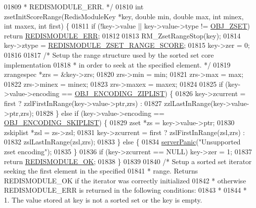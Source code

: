 \begin{DoxyCode}
{{{01809 \textcolor{comment}{ * REDISMODULE\_ERR. */}
01810 \textcolor{keywordtype}{int} zsetInitScoreRange(RedisModuleKey *key, \textcolor{keywordtype}{double} min, \textcolor{keywordtype}{double} max, \textcolor{keywordtype}{int} minex, \textcolor{keywordtype}{int} maxex, \textcolor{keywordtype}{int} first) \{
01811     \textcolor{keywordflow}{if} (!key->value || key->value->type != \hyperlink{server_8h_a8c356422ddbc03bd77694880a30a1953}{OBJ\_ZSET}) \textcolor{keywordflow}{return} 
      \hyperlink{redismodule_8h_a3df6f5bd5247289e66f44437a7cddd49}{REDISMODULE\_ERR};
01812 
01813     RM\_ZsetRangeStop(key);
01814     key->ztype = \hyperlink{module_8c_a103d0f18dc1536298a03324d5ba545be}{REDISMODULE\_ZSET\_RANGE\_SCORE};
01815     key->zer = 0;
01816 
01817     \textcolor{comment}{/* Setup the range structure used by the sorted set core implementation}
01818 \textcolor{comment}{     * in order to seek at the specified element. */}
01819     zrangespec *zrs = &key->zrs;
01820     zrs->min = min;
01821     zrs->max = max;
01822     zrs->minex = minex;
01823     zrs->maxex = maxex;
01824 
01825     \textcolor{keywordflow}{if} (key->value->encoding == \hyperlink{server_8h_aabf064ede983103f1fd0df2086e84eee}{OBJ\_ENCODING\_ZIPLIST}) \{
01826         key->zcurrent = first ? zzlFirstInRange(key->value->ptr,zrs) :
01827                                 zzlLastInRange(key->value->ptr,zrs);
01828     \} \textcolor{keywordflow}{else} \textcolor{keywordflow}{if} (key->value->encoding == \hyperlink{server_8h_acfb35db5cb30ed113ed23aeb1a224c4c}{OBJ\_ENCODING\_SKIPLIST}) \{
01829         zset *zs = key->value->ptr;
01830         zskiplist *zsl = zs->zsl;
01831         key->zcurrent = first ? zslFirstInRange(zsl,zrs) :
01832                                 zslLastInRange(zsl,zrs);
01833     \} \textcolor{keywordflow}{else} \{
01834         \hyperlink{server_8h_a11cc378e7778a830b41240578de3b204}{serverPanic}(\textcolor{stringliteral}{"Unsupported zset encoding"});
01835     \}
01836     \textcolor{keywordflow}{if} (key->zcurrent == NULL) key->zer = 1;
01837     \textcolor{keywordflow}{return} \hyperlink{redismodule_8h_a1bc5bfd69abcd378ff52c640adc5418d}{REDISMODULE\_OK};
01838 \}
01839 
01840 \textcolor{comment}{/* Setup a sorted set iterator seeking the first element in the specified}
01841 \textcolor{comment}{ * range. Returns REDISMODULE\_OK if the iterator was correctly initialized}
01842 \textcolor{comment}{ * otherwise REDISMODULE\_ERR is returned in the following conditions:}
01843 \textcolor{comment}{ *}
01844 \textcolor{comment}{ * 1. The value stored at key is not a sorted set or the key is empty.}
}}}
\end{DoxyCode}
